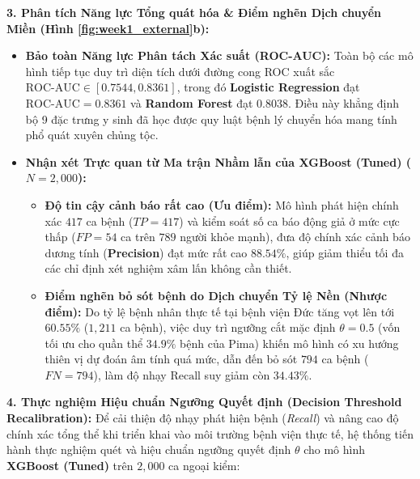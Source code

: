 \documentclass[12pt,a4paper]{report}
\begin{document}
\textbf{3. Phân tích Năng lực Tổng quát hóa \& Điểm nghẽn Dịch chuyển Miền (Hình \ref{fig:week1_external}b):}
\begin{itemize}[leftmargin=1.5em]
    \item \textbf{Bảo toàn Năng lực Phân tách Xác suất (ROC-AUC):} Toàn bộ các mô hình tiếp tục duy trì diện tích dưới đường cong ROC xuất sắc $\text{ROC-AUC} \in [0.7544, 0.8361]$, trong đó \textbf{Logistic Regression} đạt $\text{ROC-AUC} = \mathbf{0.8361}$ và \textbf{Random Forest} đạt $\mathbf{0.8038}$. Điều này khẳng định bộ 9 đặc trưng y sinh đã học được quy luật bệnh lý chuyển hóa mang tính phổ quát xuyên chủng tộc.
    \item \textbf{Nhận xét Trực quan từ Ma trận Nhầm lẫn của XGBoost (Tuned) ($N=2,000$):}
    \begin{itemize}[leftmargin=1.2em]
        \item \textbf{Độ tin cậy cảnh báo rất cao (Ưu điểm):} Mô hình phát hiện chính xác $417$ ca bệnh ($TP = 417$) và kiểm soát số ca báo động giả ở mức cực thấp ($FP = 54$ ca trên $789$ người khỏe mạnh), đưa độ chính xác cảnh báo dương tính (\textbf{Precision}) đạt mức rất cao $\mathbf{88.54\%}$, giúp giảm thiểu tối đa các chỉ định xét nghiệm xâm lấn không cần thiết.
        \item \textbf{Điểm nghẽn bỏ sót bệnh do Dịch chuyển Tỷ lệ Nền (Nhược điểm):} Do tỷ lệ bệnh nhân thực tế tại bệnh viện Đức tăng vọt lên tới $60.55\%$ ($1,211$ ca bệnh), việc duy trì ngưỡng cắt mặc định $\theta = 0.5$ (vốn tối ưu cho quần thể $34.9\%$ bệnh của Pima) khiến mô hình có xu hướng thiên vị dự đoán âm tính quá mức, dẫn đến bỏ sót $794$ ca bệnh ($FN = 794$), làm độ nhạy $\text{Recall}$ suy giảm còn $\mathbf{34.43\%}$.
    \end{itemize}
\end{itemize}

\textbf{4. Thực nghiệm Hiệu chuẩn Ngưỡng Quyết định (Decision Threshold Recalibration):}
Để cải thiện độ nhạy phát hiện bệnh (\textit{Recall}) và nâng cao độ chính xác tổng thể khi triển khai vào môi trường bệnh viện thực tế, hệ thống tiến hành thực nghiệm quét và hiệu chuẩn ngưỡng quyết định $\theta$ cho mô hình \textbf{XGBoost (Tuned)} trên $2,000$ ca ngoại kiểm:
\end{document}
